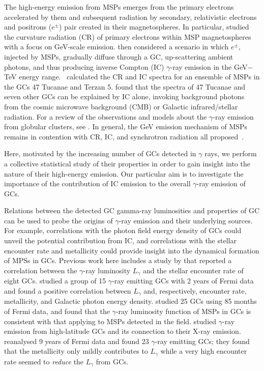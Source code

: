 \documentclass[doublespace,nopageskip]{VTthesis} %
\begin{document}
The high-energy emission from MSPs emerges from the primary electrons accelerated by them and  subsequent radiation by secondary, relativistic electrons and positrons ($e^\pm$) pair created in their magnetospheres. In particular, \citet{2005ApJ...622..531H} studied the curvature radiation (CR) of primary electrons within MSP magnetospheres with a focus on GeV-scale emission. \citet{2007MNRAS.377..920B} then considered a scenario in which $e^\pm$, injected by MSPs, gradually diffuse through a GC, up-scattering ambient photons, and thus producing inverse Compton (IC) $\gamma$-ray emission in the GeV$-$TeV energy range.~\citet{2009ApJ...696L..52V} calculated the CR and IC spectra for an ensemble of MSPs in the GCs 47 Tucanae and Terzan 5. \citet{2010ApJ...723.1219C} found that the spectra of 47 Tucanae and seven other GCs can be explained by IC alone, invoking background photons from the cosmic microwave background (CMB) or Galactic infrared/stellar radiation. {For a review of the observations and models about the $\gamma$-ray emission from globular clusters, see \citet{2016JASS...33....1T}.} In general, the GeV emission mechanism of MSPs remains in contention with CR, IC, and synchrotron radiation all  proposed~\citep{2021arXiv210105751H}.

Here, motivated by the increasing number of GCs detected in $\gamma$ rays, we perform a collective statistical study of their properties in order to gain insight into the nature of their high-energy emission. Our particular aim is to investigate the importance of the contribution of IC emission to the overall $\gamma$-ray emission of GCs.

Relations between the detected GC gamma-ray luminosities and properties of GC can be used to probe the origins of $\gamma$-ray emission and their underlying sources. For example, correlations with the photon field energy density of GCs could unveil the potential contribution from IC, and correlations with the stellar encounter rate and metallicity could provide insight into the dynamical formation of MPSs in GCs. Previous work here includes a study by \citet{2010A&A...524A..75A} that reported a correlation between the $\gamma$-ray luminosity $L_\gamma$ and the stellar encounter rate of eight GCs. \citet{2011ApJ...726..100H} studied a group of 15 $\gamma$-ray emitting GCs with 2 years of Fermi data and found a positive correlation between $L_\gamma$ and, respectively, encounter rate, metallicity, and Galactic photon energy density. \citet{2016JCAP...08..018H} studied 25 GCs using 85 months of Fermi data, and found that the $\gamma$-ray luminosity function of MSPs in GCs is consistent with that applying to MSPs detected in the field. \citet{2018MNRAS.480.4782L} studied $\gamma$-ray emission from high-latitude GCs and its connection to their X-ray emission. \citet{2019MNRAS.486..851D} reanalysed 9 years of Fermi data and found 23 $\gamma$-ray emitting GCs; they found that the metallicity only mildly contributes to $L_\gamma$ while a very high encounter rate seemed to {\it reduce} the $L_\gamma$ from GCs.
\end{document}
